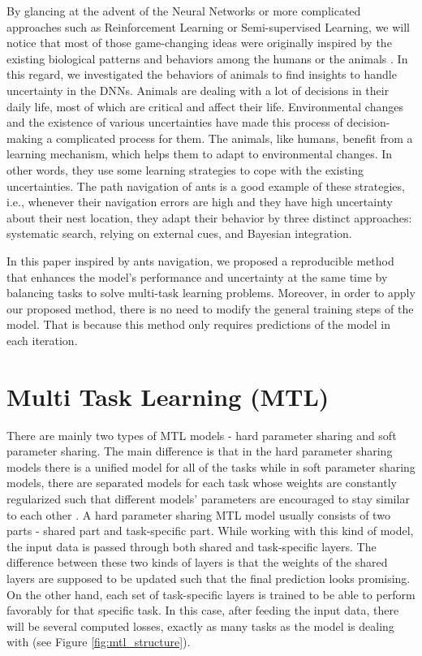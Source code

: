 \documentclass[12pt,a4paper]{article}
\begin{document}
	By glancing at the advent of the Neural Networks or more complicated approaches such as Reinforcement Learning or Semi-supervised Learning, we will notice that most of those game-changing ideas were originally inspired by the existing biological patterns and behaviors among the humans or the animals \cite{botvinick2019reinforcement}. In this regard, we investigated the behaviors of animals to find insights to handle uncertainty in the DNNs. Animals are dealing with a lot of decisions in their daily life, most of which are critical and affect their life. Environmental changes and the existence of various uncertainties have made this process of decision-making a complicated process for them. The animals, like humans, benefit from a learning mechanism, which helps them to adapt to environmental changes. In other words, they use some learning strategies to cope with the existing uncertainties. The path navigation of ants is a good example of these strategies, i.e., whenever their navigation errors are high and they have high uncertainty about their nest location, they adapt their behavior by three distinct approaches: systematic search, relying on external cues, and Bayesian integration.
	
	In this paper inspired by ants navigation, we proposed a reproducible method that enhances the model's performance and uncertainty at the same time by balancing tasks to solve multi-task learning problems. Moreover, in order to apply our proposed method, there is no need to modify the general training steps of the model. That is because this method only requires predictions of the model in each iteration.
	
	\section{Multi Task Learning (MTL)}
	
	There are mainly two types of MTL models - hard parameter sharing and soft parameter sharing. The main difference is that in the hard parameter sharing models there is a unified model for all of the tasks while in soft parameter sharing models, there are separated models for each task whose weights are constantly regularized such that different models' parameters are encouraged to stay similar to each other \cite{ruder2017overview}. A hard parameter sharing MTL model usually consists of two parts - shared part and task-specific part. While working with this kind of model, the input data is passed through both shared and task-specific layers. The difference between these two kinds of layers is that the weights of the shared layers are supposed to be updated such that the final prediction looks promising. On the other hand, each set of task-specific layers is trained to be able to perform favorably for that specific task. In this case, after feeding the input data, there will be several computed losses, exactly as many tasks as the model is dealing with (see Figure \ref{fig:mtl_structure}).
	
\end{document}
